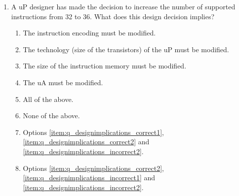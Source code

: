 \documentclass[number=1]{exam}
\begin{document}
\begin{enumerate}
\item {} A \acs{uP} designer has made the decision to increase the number of supported instructions from 32 to 36. What does this design decision implies?
\begin{enumerate}[label=\alph*)]
\item The instruction encoding must be modified.\label{item:q_designimplications_correct1}
\item The technology (size of the transistors) of the \acs{uP} must be modified.\label{item:q_designimplications_incorrect1}
\item The size of the instruction memory must be modified.\label{item:q_designimplications_incorrect2}
\item The \acs{uA} must be modified.\label{item:q_designimplications_correct2}
\item All of the above.\label{item:q_designimplications_incorrect3}
\item None of the above.\label{item:q_designimplications_incorrect4}
\item Options \ref{item:q_designimplications_correct1}, \ref{item:q_designimplications_correct2} and \ref{item:q_designimplications_incorrect2}.\label{item:q_designimplications_incorrect5}
\item Options \ref{item:q_designimplications_correct2}, \ref{item:q_designimplications_incorrect1} and \ref{item:q_designimplications_incorrect2}.\label{item:q_designimplications_incorrect6}


\end{enumerate}

\end{enumerate}
\end{document}
